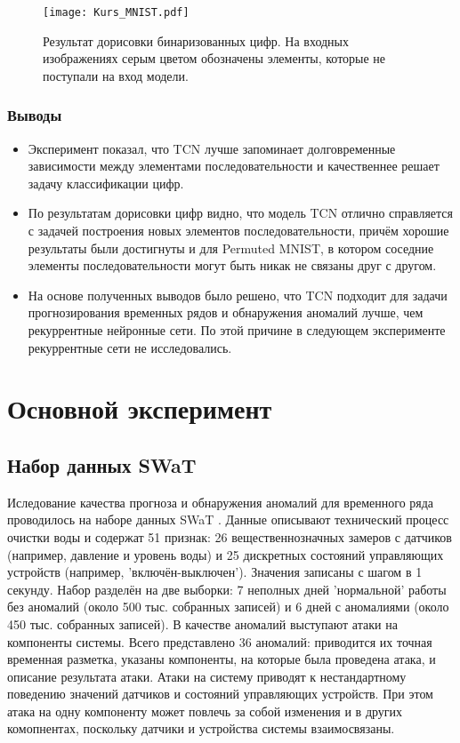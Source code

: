 \documentclass{article}
\begin{document}
\begin{figure}[h]
    	\centering
    \texttt{[image: Kurs\_MNIST.pdf]}
 	\caption{Результат дорисовки бинаризованных цифр. На входных изображениях серым цветом обозначены элементы, которые не поступали на вход модели.}
 \label{MNIST_draw}
\end{figure}

\subsubsection{Выводы}
\begin{itemize}
\item Эксперимент показал, что TCN лучше запоминает долговременные зависимости между элементами последовательности и качественнее решает задачу классификации цифр.

\item По результатам дорисовки цифр видно, что модель TCN отлично справляется с задачей построения новых элементов последовательности, причём хорошие результаты были достигнуты и для Permuted MNIST, в котором соседние элементы последовательности могут быть никак не связаны друг с другом.

\item На основе полученных выводов было решено, что TCN подходит для задачи прогнозирования временных рядов и обнаружения аномалий лучше, чем рекуррентные нейронные сети. По этой причине в следующем эксперименте рекуррентные сети не исследовались. 
\end{itemize}

\section{Основной эксперимент}

\subsection{Набор данных SWaT}
Иследование качества прогноза и обнаружения аномалий для временного ряда проводилось на наборе данных SWaT \cite{Goh2016ADT}.  Данные описывают технический процесс очистки воды и содержат 51 признак: 26 вещественнозначных замеров с датчиков (например, давление и уровень воды) и 25 дискретных состояний управляющих устройств (например, 'включён-выключен'). Значения записаны с шагом в 1 секунду. Набор разделён на две выборки: 7 неполных дней 'нормальной' работы без аномалий (около 500 тыс. собранных записей) и 6 дней с аномалиями (около 450 тыс. собранных записей). В качестве аномалий выступают атаки на компоненты системы. Всего представлено 36 аномалий: приводится их точная временная разметка, указаны компоненты, на которые была проведена атака, и описание результата атаки. Атаки на систему приводят к нестандартному поведению значений датчиков и состояний управляющих устройств. При этом атака на одну компоненту может повлечь за собой изменения и в других комопнентах, поскольку датчики и устройства системы взаимосвязаны. 
\end{document}

